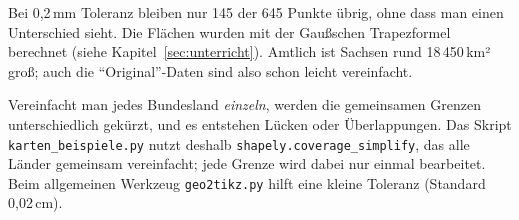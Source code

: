 

Bei 0,2\,mm Toleranz bleiben nur 145 der 645 Punkte übrig, ohne dass man einen Unterschied sieht. Die Flächen wurden mit der Gaußschen Trapezformel berechnet (siehe Kapitel~\ref{sec:unterricht}). Amtlich ist Sachsen rund 18\,450\,km² groß; auch die \enquote{Original}-Daten sind also schon leicht vereinfacht.

\begin{hinweis}
	Vereinfacht man jedes Bundesland \textit{einzeln}, werden die gemeinsamen Grenzen unterschiedlich gekürzt, und es entstehen Lücken oder Überlappungen. Das Skript \texttt{karten\_beispiele.py} nutzt deshalb \texttt{shapely.coverage\_simplify}, das alle Länder gemeinsam vereinfacht; jede Grenze wird dabei nur einmal bearbeitet. Beim allgemeinen Werkzeug \texttt{geo2tikz.py} hilft eine kleine Toleranz (Standard 0,02\,cm).
\end{hinweis}



